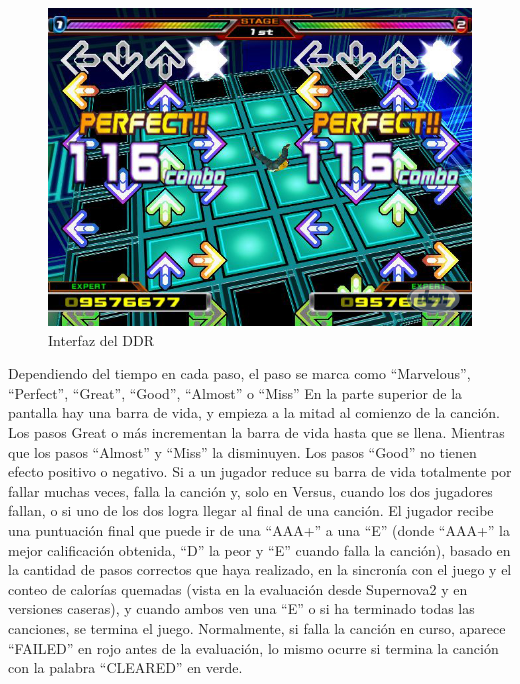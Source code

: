 \documentclass[a4paper,11pt,oneside]{book}
\begin{document}
\begin{figure}[H]
\begin{center}
\includegraphics[scale=0.3]{Imagenes/DanceDanceScreen1.jpeg}
\caption{Interfaz del DDR}
\label{Interfaz del DDR}
\end{center}
\end{figure}


Dependiendo del tiempo en cada paso, el paso se marca como ``Marvelous'', ``Perfect'', ``Great'', ``Good'', ``Almost'' o ``Miss'' En la parte superior de la pantalla hay una barra de vida, y empieza a la mitad al comienzo de la canción. Los pasos Great o más incrementan la barra de vida hasta que se llena. Mientras que los pasos ``Almost'' y ``Miss'' la disminuyen. Los pasos ``Good'' no tienen efecto positivo o negativo. Si a un jugador reduce su barra de vida totalmente por fallar muchas veces, falla la canción y, solo en Versus, cuando los dos jugadores fallan, o si uno de los dos logra llegar al final de una canción.
 El jugador recibe una puntuación final que puede ir de una ``AAA+'' a una ``E'' (donde ``AAA+'' la mejor calificación obtenida, ``D'' la peor y ``E'' cuando falla la canción), basado en la cantidad de pasos correctos que haya realizado, en la sincronía con el juego y el conteo de calorías quemadas (vista en la evaluación desde Supernova2 y en versiones caseras), y cuando ambos ven una ``E'' o si ha terminado todas las canciones, se termina el juego. Normalmente, si falla la canción en curso, aparece ``FAILED'' en rojo antes de la evaluación, lo mismo ocurre si termina la canción con la palabra ``CLEARED'' en verde.
\end{document}
